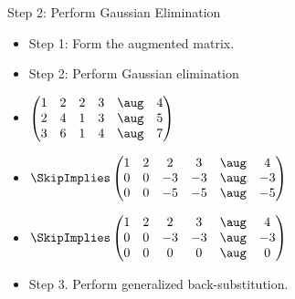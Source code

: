 \documentclass{beamer}
\begin{document}
\begin{frame}{Step 2: Perform Gaussian Elimination}

\begin{itemize}
\item Step 1: Form the augmented matrix.
\item Step 2: Perform Gaussian elimination
\item
$
\begin{pmatrix}
1 & 2 & 2 & 3  & \aug &  4 \\
2 & 4 & 1 & 3  & \aug &  5 \\
3 & 6 & 1 & 4  & \aug &  7
\end{pmatrix}
$
\item
$
\SkipImplies
\begin{pmatrix}
1 & 2 & 2 &   3  & \aug &  4 \\
0 & 0 & -3 & -3  & \aug & -3 \\
0 & 0 & -5 & -5  & \aug & -5
\end{pmatrix}
$
\item
$
\SkipImplies
\begin{pmatrix}
1 & 2 &  2 &  3 &   \aug &  4 \\
0 & 0 & -3 & -3 &   \aug & -3 \\
0 & 0 &  0 &  0 &   \aug & 0
\end{pmatrix}
$
\item Step 3. Perform generalized back-substitution.
\end{itemize}
\end{frame}
\end{document}
